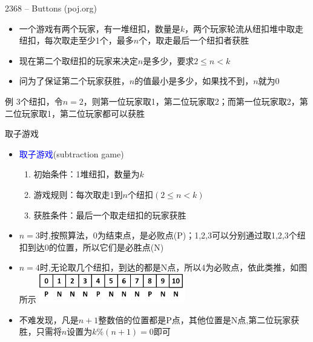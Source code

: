 \begin{frame}{2368 -- Buttons (poj.org)}
    \begin{itemize}
        \item 一个游戏有两个玩家，有一堆纽扣，数量是$k$，两个玩家轮流从纽扣堆中取走纽扣，每次取走至少1个，最多$n$个，取走最后一个纽扣者获胜
        \item 现在第二个取纽扣的玩家来决定$n$是多少，要求$2 \leq n < k$
        \item 问为了保证第二个玩家获胜，$n$的值最小是多少，如果找不到，$n$就为0
    \end{itemize}
    \begin{exampleblock}{例}
        3个纽扣，令$n=2$，则第一位玩家取1，第二位玩家取2；而第一位玩家取2，第二位玩家取1，第二位玩家都可以获胜
    \end{exampleblock}
\end{frame}
\begin{frame}{取子游戏}
    \begin{itemize}
        \item \textcolor{blue}{取子游戏}(subtraction game)
        \begin{enumerate}[(1)]
            \item 初始条件：1堆纽扣，数量为$k$
            \item 游戏规则：每次取走1到$n$个纽扣$(2\leq n < k)$
            \item 获胜条件：最后一个取走纽扣的玩家获胜
        \end{enumerate}
        \item $n=3$时,按照算法，0为结束点，是必败点(P)；1,2,3可以分别通过取1,2,3个纽扣到达0的位置，所以它们是必胜点(N)
        \item $n=4$时,无论取几个纽扣，到达的都是N点，所以4为必败点，依此类推，如图所示
        \vfill
        \includegraphics[width=0.5\textwidth,center]{fig/7-4.png}
        \item 不难发现，凡是$n+1$整数倍的位置都是P点，其他位置是N点,第二位玩家获胜，只需将$n$设置为$k\%(n+1)=0$即可   
    \end{itemize}
\end{frame}
